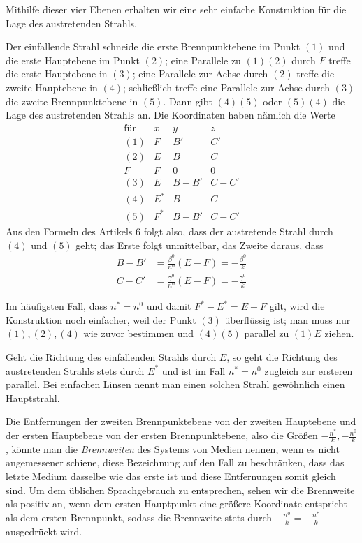 Mithilfe dieser vier Ebenen erhalten wir eine sehr einfache Konstruktion für die Lage des austretenden Strahls.

Der einfallende Strahl schneide die erste Brennpunktebene im Punkt $(1)$ und die erste Hauptebene im Punkt $(2)$; eine Parallele zu $(1)(2)$ durch $F$ treffe die erste Hauptebene in $(3)$; eine Parallele zur Achse durch $(2)$ treffe die zweite Hauptebene in $(4)$; schließlich treffe eine Parallele zur Achse durch $(3)$ die zweite Brennpunktebene in $(5)$. Dann gibt $(4)(5)$ oder $(5)(4)$ die Lage des austretenden Strahls an. Die Koordinaten haben nämlich die Werte
\[
\renewcommand{\arraystretch}{1.25}
\begin{array}{c||c|c|c}
\text{für}&x&y&z\\\hline
(1)&F&B'&C'\\
(2)&E&B&C\\
F&F&0&0\\
(3)&E&B-B'&C-C'\\
(4)&E^*&B&C\\
(5)&F^*&B-B'&C-C'
\end{array}
\]
Aus den Formeln des Artikels 6 folgt also, dass der austretende Strahl durch $(4)$ und $(5)$ geht; das Erste folgt unmittelbar, das Zweite daraus, dass
\[
\begin{aligned}
B-B'&=\frac{\beta^0}{n^0}(E-F)=-\frac{\beta^0}k\\
C-C'&=\frac{\gamma^0}{n^0}(E-F)=-\frac{\gamma^0}k
\end{aligned}
\]

Im häufigsten Fall, dass $n^*=n^0$ und damit $F^*-E^*=E-F$ gilt, wird die Konstruktion noch einfacher, weil der Punkt $(3)$ überflüssig ist; man muss nur $(1),(2),(4)$ wie zuvor bestimmen und $(4)(5)$ parallel zu $(1)E$ ziehen.

Geht die Richtung des einfallenden Strahls durch $E$, so geht die Richtung des austretenden Strahls stets durch $E^*$ und ist im Fall $n^*=n^0$ zugleich zur ersteren parallel. Bei einfachen Linsen nennt man einen solchen Strahl gewöhnlich einen Hauptstrahl.

Die Entfernungen der zweiten Brennpunktebene von der zweiten Haupt\-ebene und der ersten Hauptebene von der ersten Brennpunktebene, also die Größen $-\frac{n^*}k,-\frac{n^0}k$, könnte man die \textit{Brennweiten} des Systems von Medien nennen, wenn es nicht angemessener schiene, diese Bezeichnung auf den Fall zu beschränken, dass das letzte Medium dasselbe wie das erste ist und diese Entfernungen somit gleich sind. Um dem üblichen Sprachgebrauch zu entsprechen, sehen wir die Brennweite als positiv an, wenn dem ersten Hauptpunkt eine größere Koordinate entspricht als dem ersten Brennpunkt, sodass die Brennweite stets durch $-\frac{n^0}k=-\frac{n^*}k$ ausgedrückt wird.

